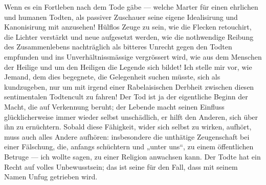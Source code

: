 Wenn es ein Fortleben nach dem Tode gäbe — welche Marter für einen ehrlichen und humanen Todten, als passiver Zuschauer seine eigene Idealisirung und Kanonisirung mit anzusehen! Hülflos Zeuge zu sein, wie die Flecken retouchirt, die Lichter verstärkt und neue aufgesetzt werden, wie die nothwendige Reibung des Zusammenlebens nachträglich als bitteres Unrecht gegen den Todten empfunden und ins Unverhältnissmässige vergrössert wird, wie aus dem Menschen der Heilige und um den Heiligen die Legende sich bildet! Ich stelle mir vor, wie Jemand, dem dies begegnete, die Gelegenheit suchen müsste, sich als  kundzugeben, nur um mit irgend einer Rabelaisischen Derbheit zwischen diesen sentimentalen Todtencult zu fahren! Der Tod ist ja der eigentliche Beginn der Macht, die auf Verkennung beruht; der Lebende macht seinen Einfluss glücklicherweise immer wieder selbst unschädlich, er hilft den Anderen, sich über ihn zu ernüchtern. Sobald diese Fähigkeit, wider sich selbst zu wirken, aufhört, muss auch alles Andere aufhören: insbesondere die unthätige Zeugenschaft bei einer Fälschung, die, anfangs schüchtern und „unter uns“, zu einem öffentlichen Betruge — ich wollte sagen, zu einer Religion anwachsen kann. Der Todte hat ein Recht auf volles Unbewusstsein; das ist seine  für den Fall, dass mit seinem Namen Unfug getrieben wird.
\par


